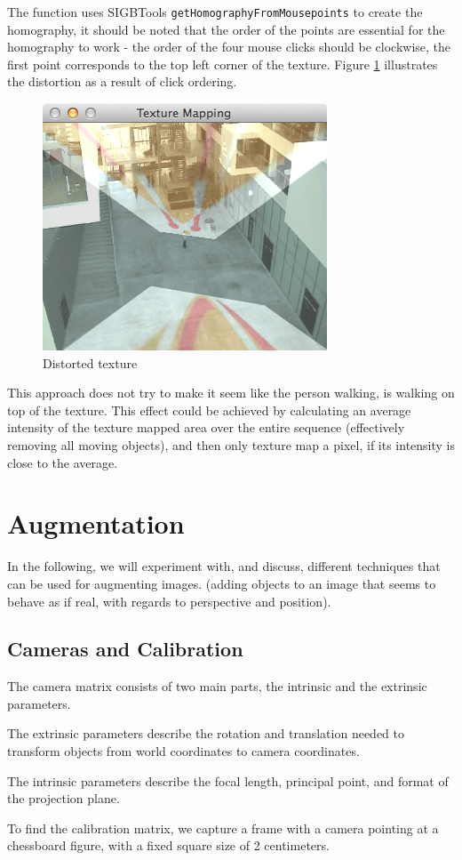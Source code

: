 \documentclass[a4paper,11pt]{article}
\begin{document}
\noindent
The function uses SIGBTools \texttt{getHomographyFromMousepoints} to create the homography, it should be noted that the order of the points are essential for the homography to work - the order of the four mouse clicks should be clockwise, the first point corresponds to the top left corner of the texture. Figure \ref{fig:floor_fail} illustrates the distortion as a result of click ordering.

\begin{figure}[H]
\centering
\includegraphics[width=0.32\linewidth]{floor_fail}
\caption{Distorted texture}
\label{fig:floor_fail}
\end{figure}

This approach does not try to make it seem like the person walking, is walking on top of the texture. This effect could be achieved by calculating an average intensity of the texture mapped area over the entire sequence (effectively removing all moving objects), and then only texture map a pixel, if its intensity is close to the average.

\section{Augmentation}
\label{sec:aug}
In the following, we will experiment with, and discuss, different techniques that can be used for augmenting images. (adding objects to an image that seems to behave as if real, with regards to perspective and position).
\subsection{Cameras and Calibration}
The camera matrix consists of two main parts, the intrinsic and the extrinsic parameters.

The extrinsic parameters describe the rotation and translation needed to transform objects from world coordinates to camera coordinates.

The intrinsic parameters describe the focal length, principal point, and format of the projection plane.

To find the calibration matrix, we capture a frame with a camera pointing at a chessboard figure, with a fixed square size of 2 centimeters.
\end{document}
